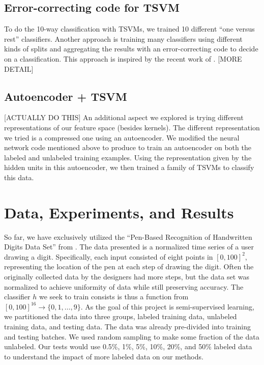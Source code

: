 \documentclass[11pt]{article}
\begin{document}
\subsection{Error-correcting code for TSVM}

To do the 10-way classification with TSVMs, we trained 10 different ``one versus rest'' classifiers. Another approach is training many classifiers using different kinds of splits and aggregating the results with an error-correcting code to decide on a classification. This approach is inspired by the recent work of \cite{DBLP:journals/corr/BalcanDM15}. [MORE DETAIL]

\subsection{Autoencoder + TSVM}

[ACTUALLY DO THIS] An additional aspect we explored is trying different representations of our feature space (besides kernels). The different representation we tried is a compressed one using an autoencoder. We modified the neural network code mentioned above to produce to train an autoencoder on both the labeled and unlabeled training examples. Using the representation given by the hidden units in this autoencoder, we then trained a family of TSVMs to classify this data.

\section{Data, Experiments, and Results}

So far, we have exclusively utilized the ``Pen-Based Recognition of Handwritten Digits Data Set'' from \cite{Alpaydin:1998}. The data presented is a normalized time series of a user drawing a digit. Specifically, each input consisted of eight points in $[0, 100]^2$, representing the location of the pen at each step of drawing the digit. Often the originally collected data by the designers had more steps, but the data set was normalized to achieve uniformity of data while still preserving accuracy. The classifier $h$ we seek to train consists is thus a function from $[0, 100]^{16} \to \{0, 1, \hdots, 9\}$.  As the goal of this project is semi-supervised learning, we partitioned the data into three groups, labeled training data, unlabeled training data, and testing data. The data was already pre-divided into training and testing batches. We used random sampling to make some fraction of the data unlabeled. Our tests would use 0.5\%, 1\%, 5\%, 10\%, 20\%, and 50\% labeled data to understand the impact of more labeled data on our methods.
\end{document}
